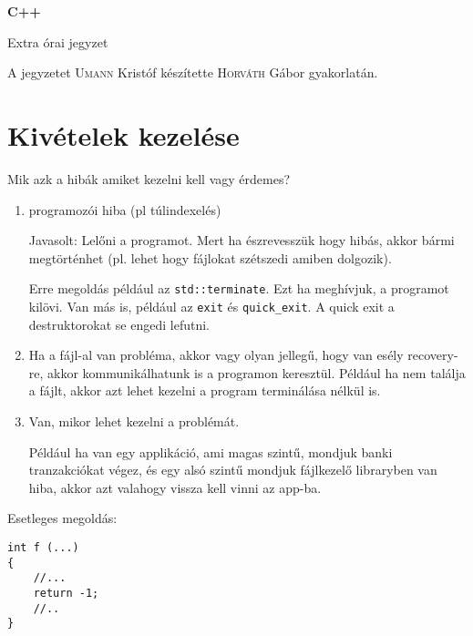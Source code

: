 \documentclass[a4paper,11.5pt]{article}
\begin{document}
	\setlength\parindent{0pt}
	\def\s{\hspace{0.2mm}\vphantom{\beta}}
	\def\Z{\mathbb{Z}}
	\def\Q{\mathbb{Q}}
	\def\R{\mathbb{R}}
	\def\C{\mathbb{C}}
	\def\N{\mathbb{N}}
	\def\Ra{\overline{\mathbb{R}}}
	
	\def\sume{\displaystyle\sum_{n=1}^{+\infty}}
	\def\sumn{\displaystyle\sum_{n=0}^{+\infty}}
	
	\def\narrow{\underset{n\rightarrow+\infty}{\longrightarrow}}
	\def\limn{\displaystyle\lim_{n\to +\infty}}
	\def\limx{\displaystyle\lim_{x\to +\infty}}
	
	\theoremstyle{definition}
	\newtheorem{theorem}{Tétel}[subsection] 
	
	\theoremstyle{definition}
	\newtheorem{definition}[theorem]{Definíció} 
	\newtheorem{example}[theorem]{Példa} 
	\newtheorem{task}[theorem]{Feladat} 
	\newtheorem{note}[theorem]{Megjegyzés}
	\begin{center}
		{\LARGE\textbf{C++}}
		
		{\Large Extra órai jegyzet}
	\end{center}
	A jegyzetet \textsc{Umann} Kristóf készítette \textsc{Horváth} Gábor gyakorlatán.
	\medskip
	
	\section{Kivételek kezelése}
	
	Mik azk a hibák amiket kezelni kell vagy érdemes? 
	
	\begin{enumerate}
		\item programozói hiba (pl túlindexelés)
		
		Javasolt: Lelőni a programot. Mert ha észrevesszük hogy hibás, akkor bármi megtörténhet (pl. lehet hogy fájlokat szétszedi amiben dolgozik).
		
		Erre megoldás például az \texttt{std::terminate}. Ezt ha meghívjuk, a programot kilövi. Van más is, például az \texttt{exit} és \texttt{quick\_exit}. A quick exit a destruktorokat se engedi lefutni.
		
		\item Ha a fájl-al van probléma, akkor vagy olyan jellegű, hogy van esély recovery-re, akkor kommunikálhatunk is a programon keresztül. Például ha nem találja a fájlt, akkor azt lehet kezelni a program terminálása nélkül is.
		
		\item Van, mikor lehet kezelni a problémát. 
		
		Például ha van egy applikáció, ami magas szintű, mondjuk banki tranzakciókat végez, és egy alsó szintű mondjuk fájlkezelő libraryben van hiba, akkor azt valahogy vissza kell vinni az app-ba.
		
	\end{enumerate}
		Esetleges megoldás:
		\begin{lstlisting}
int f (...)
{
	//...
	return -1;
	//..
}
		\end{lstlisting}
\end{document}
